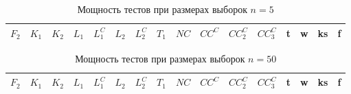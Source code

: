 \documentclass{article}
\begin{document}
\begin{longtable}{|c|c|c|c|c|c|c|c|c|c|c|c|c|c|c|c|}
  \caption{Мощность тестов при размерах выборок $n=5$}
  \label{table:n5} \\
  \hline
  $F_2$ & $K_{1}$ & $K_{2}$ & $L_{1}$ & $L_{1}^C$ & $L_{2}$ & $L_{2}^C$ & $T_1$ & $NC$ & $CC^C$ & $CC_2^C$ & $CC_3^C$ & t & w & ks & f \\ \hline
  
  
  
  
\end{longtable}

\begin{longtable}{|c|c|c|c|c|c|c|c|c|c|c|c|c|c|c|c|}
  \caption{Мощность тестов при размерах выборок $n=50$}
  \label{table:n50} \\
  \hline
  $F_2$ & $K_{1}$ & $K_{2}$ & $L_{1}$ & $L_{1}^C$ & $L_{2}$ & $L_{2}^C$ & $T_1$ & $NC$ & $CC^C$ & $CC_2^C$ & $CC_3^C$ & t & w & ks & f \\ \hline
  
  
  
  
\end{longtable}
\end{document}
